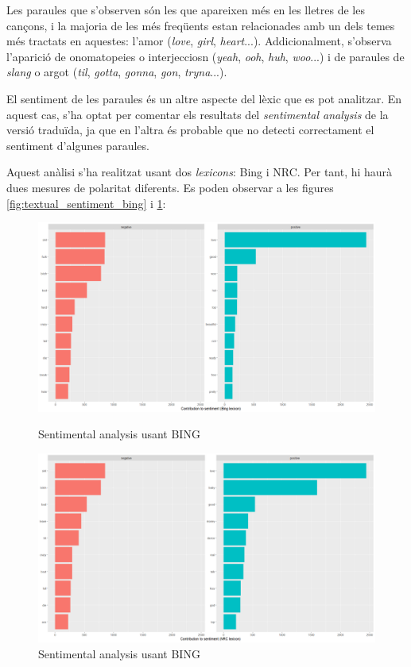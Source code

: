 Les paraules que s'observen són les que apareixen més en les lletres de les cançons, i la majoria de les més freqüents estan relacionades amb un dels temes més tractats en aquestes: l'amor (\textit{love}, \textit{girl}, \textit{heart}...). Addicionalment, s'observa l'aparició de onomatopeies o interjecciosn (\textit{yeah}, \textit{ooh}, \textit{huh}, \textit{woo}...) i de paraules de \textit{slang} o argot (\textit{til}, \textit{gotta}, \textit{gonna}, \textit{gon}, \textit{tryna}...).

El sentiment de les paraules és un altre aspecte del lèxic que es pot analitzar. En aquest cas, s'ha optat per comentar els resultats del \textit{sentimental analysis} de la versió traduïda, ja que en l'altra és probable que no detecti correctament el sentiment d'algunes paraules.

Aquest anàlisi s'ha realitzat usant dos \textit{lexicons}: Bing i NRC. Per tant, hi haurà dues mesures de polaritat diferents. Es poden observar a les figures \ref{fig:textual_sentiment_bing} i \ref{fig:textual_sentiment_nrc}:

\begin{figure}[H]
\centering
    \begin{minipage}{.4\textwidth}
        \centering
        \includegraphics[width=0.95\linewidth]{Images//8_Textual//Analysis/complete_word_senti_bing.png}
        \caption{Sentimental analysis usant BING}
        \label{fig:textual_sentiment_bing}
    \end{minipage}%
    \begin{minipage}{.4\textwidth}
        \centering
        \includegraphics[width=0.95\linewidth]{Images//8_Textual//Analysis/complete_word_senti_nrc.png}
        \caption{Sentimental analysis usant BING}
        \label{fig:textual_sentiment_nrc}
    \end{minipage}%
\end{figure}

